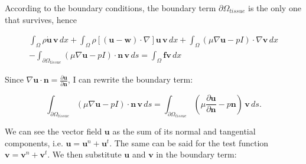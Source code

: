 \documentclass[11pt,a4paper,titlepage]{report}
\begin{document}
According to the boundary conditions, the boundary term $\partial \Omega_{tissue}$ is the only one that survives, hence

\begin{align*}
 \int_{\Omega} \rho \dot{\mathbf{u}} \, \mathbf{v} \, dx
+ \int_{\Omega} \rho [(\mathbf{u - w}) \cdot \nabla] \mathbf{u} \, \mathbf{v} \, dx
+ \int_{\Omega} (\mu \nabla \mathbf{u} - pI) \cdot \nabla \mathbf{v} \, dx \\
- \int_{\partial \Omega_{tissue}} (\mu \nabla \mathbf{u} - pI) \cdot \mathbf{n} \, \mathbf{v} \, ds
= \int_{\Omega} \mathbf{f} \mathbf{v} \, dx
\end{align*}

Since $\nabla \mathbf{u} \cdot \mathbf{n} = \frac{\partial \mathbf{u}}{\partial \mathbf{n}}$, I can rewrite the boundary term:

\[
\int_{\partial \Omega_{tissue}} (\mu \nabla \mathbf{u} -  pI) \cdot \mathbf{n} \, \mathbf{v} \, ds = \int_{\partial \Omega_{tissue}} (\mu \frac{\partial \mathbf{u}}{\partial \mathbf{n}} -  p \mathbf{n}) \, \mathbf{v} \, ds.
\]


We can see the vector field $\mathbf{u}$ as the sum of its normal and tangential components, i.e. $\mathbf{u} = \mathbf{u}^n + \mathbf{u}^t$. The same can be said for the test function $\mathbf{v} = \mathbf{v}^n + \mathbf{v}^t$. We then substitute $\mathbf{u}$ and $\mathbf{v}$ in the boundary term:
\end{document}
